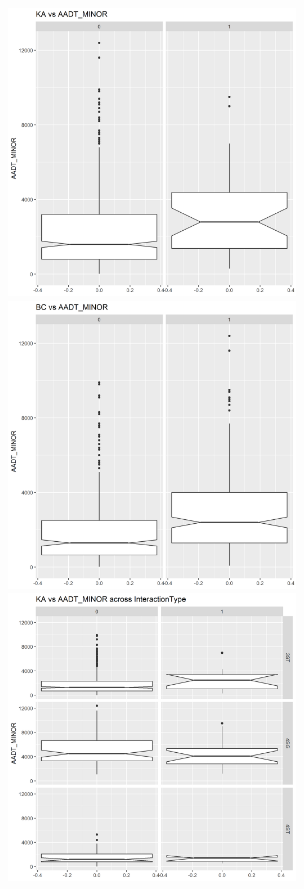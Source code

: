 \documentclass[11pt]{scrartcl} %
\begin{document}
\begin{figure}[H]
\begin{minipage}[t]{0.5\linewidth}
\centering
\includegraphics[width=3in]{image/extra5.png}
\small
\end{minipage}
\begin{minipage}[t]{0.5\linewidth}
\centering
\includegraphics[width=3in]{image/extra6.png}
\small
\end{minipage}
\begin{minipage}[t]{0.5\linewidth}
\centering
\includegraphics[width=3in]{image/extra7.png}

\end{minipage}
\end{figure}
\end{document}
